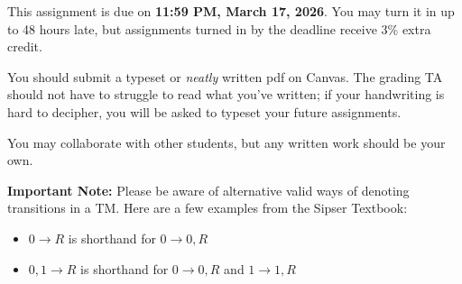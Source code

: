 \documentclass[11pt]{article}
\begin{document}

This assignment is due on \textbf{11:59 PM, March 17, 2026}. You may turn it in up to 48 hours late, but assignments turned in by the deadline receive 3\% extra credit.

You should submit a typeset or \emph{neatly} written pdf on Canvas.  The grading TA should not have to struggle to read what you've written; if your handwriting is hard to decipher, you will be asked to typeset your future assignments.

You may collaborate with other students, but any written work should be your own. 


\textbf{Important Note:} Please be aware of alternative valid ways of denoting transitions in a TM. Here are a few examples from the Sipser Textbook: 

\begin{itemize}
    \item $0 \rightarrow R$ is shorthand for $0 \rightarrow 0, R$
    \item $0, 1 \rightarrow R$ is shorthand for $0 \rightarrow 0, R$ and $1 \rightarrow 1, R$
\end{itemize}
\end{document}
